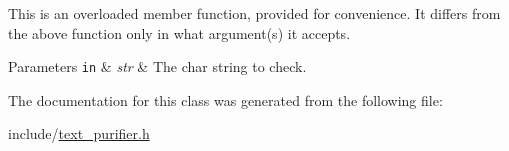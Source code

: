 This is an overloaded member function, provided for convenience. It differs from the above function only in what argument(s) it accepts. 
\begin{DoxyParams}[1]{Parameters}
\mbox{\tt in}  & {\em str} & The char string to check. \\
\hline
\end{DoxyParams}


The documentation for this class was generated from the following file\+:\begin{DoxyCompactItemize}
\item 
include/\hyperlink{text__purifier_8h}{text\+\_\+purifier.\+h}\end{DoxyCompactItemize}
